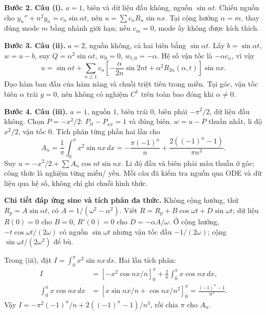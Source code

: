 \documentclass[10pt,a4paper]{article}
\begin{document}
\textbf{Bước 2. Câu (i).} $a=1$, biên và dữ liệu đầu không, nguồn $\sin\alpha t$. Chiếu nguồn cho $y_n''+n^2y_n=c_n\sin\alpha t$, nên $u=\sum c_nR_n\sin nx$. Tại cộng hưởng $\alpha=m$, thay đúng mode $m$ bằng nhánh giới hạn; nếu $c_m=0$, mode ấy không được kích thích.

\textbf{Bước 3. Câu (ii).} $a=2$, nguồn không, cả hai biên bằng $\sin\alpha t$. Lấy $b=\sin\alpha t$, $w=u-b$, suy $Q=\alpha^2\sin\alpha t$, $w_0=0$, $w_{t,0}=-\alpha$. Hệ số vận tốc là $-\alpha c_n$, vì vậy
\[u=\sin\alpha t+\sum_{n\ge1}c_n\left[-\frac\alpha{2n}\sin2nt+\alpha^2R_{2n}(\alpha,t)\right]\sin nx.\]
Đạo hàm ban đầu của hàm nâng và chuỗi triệt tiêu trong miền. Tại góc, vận tốc biên $\alpha$ trái $g=0$, nên không có nghiệm $C^1$ trên toàn bao đóng khi $\alpha\ne0$.

\textbf{Bước 4. Câu (iii).} $a=1$, nguồn $1$, biên trái $0$, biên phải $-\pi^2/2$, dữ liệu đầu không. Chọn $P=-x^2/2$: $P_{tt}-P_{xx}=1$ và đúng biên. $w=u-P$ thuần nhất, li độ $x^2/2$, vận tốc $0$. Tích phân từng phần hai lần cho
\[A_n=\frac1\pi\int_0^\pi x^2\sin nx\,dx
=-\frac{\pi(-1)^n}{n}+\frac{2((-1)^n-1)}{\pi n^3}.\]
Suy $u=-x^2/2+\sum A_n\cos nt\sin nx$. Li độ đầu và biên phải mâu thuẫn ở góc; công thức là nghiệm từng miền/ yếu. Mỗi câu đã kiểm tra nguồn qua ODE và dữ liệu qua hệ số, không chỉ ghi chuỗi hình thức.

\textbf{Chi tiết đáp ứng sine và tích phân đa thức.} Không cộng hưởng, thử $R_p=A\sin\alpha t$, có $A=1/(\omega^2-\alpha^2)$. Viết $R=R_p+B\cos\omega t+D\sin\omega t$; dữ liệu $R(0)=0$ cho $B=0$, $R'(0)=0$ cho $D=-\alpha A/\omega$. Ở cộng hưởng, $-t\cos\omega t/(2\omega)$ có nguồn $\sin\omega t$ nhưng vận tốc đầu $-1/(2\omega)$; cộng $\sin\omega t/(2\omega^2)$ để bù.

Trong (iii), đặt $I=\int_0^\pi x^2\sin nx\,dx$. Hai lần tích phân:
\[\begin{aligned}
I&=\left[-x^2\cos nx/n\right]_0^\pi+\frac2n\int_0^\pi x\cos nx\,dx,\\
\int_0^\pi x\cos nx\,dx
&=\left[x\sin nx/n+\cos nx/n^2\right]_0^\pi
=\frac{(-1)^n-1}{n^2}.
\end{aligned}\]
Vậy $I=-\pi^2(-1)^n/n+2((-1)^n-1)/n^3$, rồi chia $\pi$ cho $A_n$.
\end{document}
